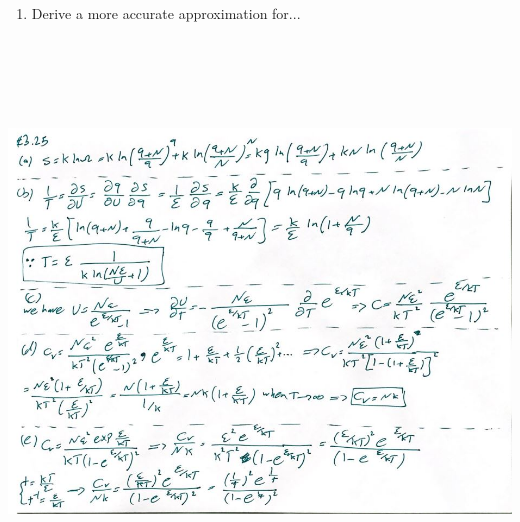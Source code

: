 \documentclass[fleqn]{article}
\begin{document}
\begin{enumerate}
\begin{enumerate}
      \item Derive a more accurate approximation for...

    \end{enumerate}

    \begin{center}
      \includegraphics[height=15cm, width=15cm]{325A.JPG}
    \end{center}

    \pagebreak


\end{enumerate}
\end{document}
